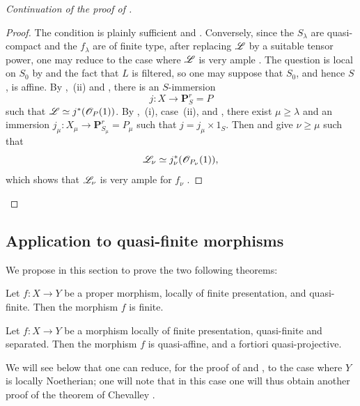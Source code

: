 \begin{proof}[Continuation of the proof of ]
\begin{proof}
The condition is plainly sufficient  and . Conversely, since the $S_\lambda$ are quasi-compact and the $f_\lambda$ are of finite type, after replacing $\mathscr{L}$ by a suitable tensor power, one may reduce to the case where $\mathscr{L}$ is very ample . The question is local on $S_0$ by  and the fact that $L$ is filtered, so one may suppose that $S_0$, and hence $S$, is affine. By ,~(ii) and , there is an $S$-immersion
\[
  j:X\longrightarrow\mathbf{P}^r_S=P
\]
such that $\mathscr{L}\simeq j^*(\mathscr{O}_P(1))$. By ,~(i), case~(ii), and , there exist $\mu\geqslant\lambda$ and an immersion $j_\mu:X_\mu\to\mathbf{P}^r_{S_\mu}=P_\mu$ such that $j=j_\mu\times1_S$. Then  and  give $\nu\geqslant\mu$ such that
\[
  \mathscr{L}_\nu\simeq j_\nu^*(\mathscr{O}_{P_\nu}(1)),
\]
which shows that $\mathscr{L}_\nu$ is very ample for $f_\nu$ .
\end{proof}
\end{proof}

\subsection{Application to quasi-finite morphisms}
\label{subsection:IV.8.11}
\label{IV.8.11}

We propose in this section to prove the two following theorems:

\begin{theorem}[8.11.1]
\label{IV.8.11.1}
Let $f:X\to Y$ be a proper morphism, locally of finite presentation, and quasi-finite.
Then the morphism $f$ is finite.
\end{theorem}

\begin{theorem}[8.11.2]
\label{IV.8.11.2}
Let $f:X\to Y$ be a morphism locally of finite presentation, quasi-finite and separated.
Then the morphism $f$ is quasi-affine, and a fortiori quasi-projective.
\end{theorem}

\begin{remark}[8.11.3]
\label{IV.8.11.3}
We will see below that one can reduce, for the proof of  and , to the case where $Y$ is locally Noetherian; one will note that in this case one will thus obtain another proof of the theorem of Chevalley .
\end{remark}

